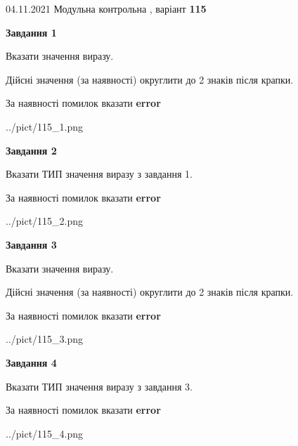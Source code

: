 \documentclass[11pt, ukrainian]{article}
\begin{document}
{04.11.2021 Модульна контрольна , варіант  \No \textbf { 115 }\par}
{
\begin {large}
{\begin {center}\textbf{Завдання 1}\end {center}}\par
Вказати значення виразу. \par
Дійсні значення (за наявності) округлити до 2 знаків після крапки. \par
За наявності помилок вказати \textbf{error}

\begin{center}
	{../pict/115_1.png}
\end{center}
\newpage

{\begin {center}\textbf{Завдання 2}\end {center}}\par
Вказати ТИП значення виразу з завдання 1. \par
За наявності помилок вказати \textbf{error}

\begin{center}
	{../pict/115_2.png}
\end{center}
\newpage

{\begin {center}\textbf{Завдання 3}\end {center}}\par
Вказати значення виразу. \par
Дійсні значення (за наявності) округлити до 2 знаків після крапки. \par
За наявності помилок вказати \textbf{error}

\begin{center}
	{../pict/115_3.png}
\end{center}
\newpage

{\begin {center}\textbf{Завдання 4}\end {center}}\par
Вказати ТИП значення виразу з завдання 3. \par
За наявності помилок вказати \textbf{error}

\begin{center}
	{../pict/115_4.png}
\end{center}
\newpage


\end{large}}
\end{document}
